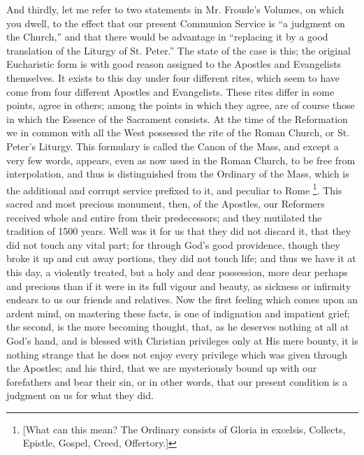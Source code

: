 And thirdly, let me refer to two statements in
Mr. Froude's Volumes, on which you dwell, to the effect that our
present Communion Service is ``a judgment on the Church,'' and that
there would be advantage in ``replacing it by a good translation of
the Liturgy of St. Peter.'' The state of the case is this; the
original Eucharistic form is with good reason assigned to the Apostles
and Evangelists themselves. It exists to this day under four different
rites, which seem to have come from four different Apostles and
Evangelists. These rites differ in some points, agree in others; among
the points in which they agree, are of course those in which the
Essence of the Sacrament consists. At the time of the Reformation we
in common with all the West possessed the rite of the Roman Church, or
St. Peter's Liturgy. This formulary is called the Canon of the Mass,
and except a very few words, appears, even as now used in the Roman
Church, to be free from interpolation, and thus is distinguished from
the Ordinary of the Mass, which is the additional and corrupt
service prefixed to it, and peculiar to Rome \footnote{[What can this mean? The Ordinary consists of Gloria in excelsis,
Collects, Epistle, Gospel, Creed, Offertory.]}. This sacred
and most precious monument, then, of the Apostles, our Reformers
received whole and entire from their predecessors; and they mutilated
the tradition of 1500 years. Well was it for us that they did not
discard it, that they did not touch any vital part; for through
God's good providence, though they broke it up and cut away
portions, they did not touch life; and thus we have it at this day, a
violently treated, but a holy and dear possession, more dear perhaps
and precious than if it were in its full vigour and beauty, as
sickness or infirmity endears to us our friends and relatives. Now the
first feeling which comes upon an ardent mind, on mastering these
facts, is one of indignation and impatient grief; the second, is the
more becoming thought, that, as he deserves nothing at all at God's
hand, and is blessed with Christian privileges only at His mere
bounty, it is nothing strange that he does not enjoy every privilege
which was given through the Apostles; and his third, that we are
mysteriously bound up with our forefathers and bear their sin, or in
other words, that our present condition is a judgment on us for what
they did.

